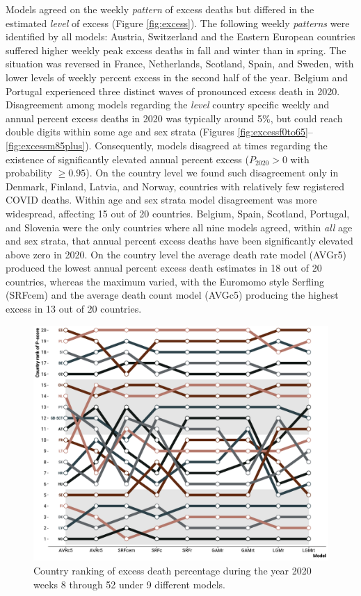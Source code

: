 \documentclass[12pt]{article}
\begin{document}
Models agreed on the weekly \emph{pattern} of excess deaths but differed in the estimated \emph{level} of excess (Figure \ref{fig:excess}). The following weekly \emph{patterns} were identified by all models: Austria, Switzerland and the Eastern European countries suffered higher weekly peak excess deaths in fall and winter than in spring. The situation was reversed in France, Netherlands, Scotland, Spain, and Sweden, with lower levels of weekly percent excess in the second half of the year. Belgium and Portugal experienced three distinct waves of pronounced excess death in 2020. Disagreement among models regarding the \emph{level} country specific weekly and annual percent excess deaths in 2020 was typically around 5\%, but could reach double digits within some age and sex strata (Figures \ref{fig:excessf0to65}--\ref{fig:excessm85plus}). Consequently, models disagreed at times regarding the existence of significantly elevated annual percent excess ($P_{2020}>0$ with probability $\geq 0.95$). On the country level we found such disagreement only in Denmark, Finland, Latvia, and Norway, countries with relatively few registered COVID deaths. Within age and sex strata model disagreement was more widespread, affecting 15 out of 20 countries. Belgium, Spain, Scotland, Portugal, and Slovenia were the only countries where all nine models agreed, within \emph{all} age and sex strata, that annual percent excess deaths have been significantly elevated above zero in 2020. On the country level the average death rate model (AVGr5) produced the lowest annual percent excess death estimates in 18 out of 20 countries, whereas the maximum varied, with the Euromomo style Serfling (SRFcem) and the average death count model (AVGc5) producing the highest excess in 13 out of 20 countries.


\begin{figure}
  \caption{Country ranking of excess death percentage during the year 2020 weeks 8 through 52 under 9 different models.}
  \label{fig:rank}
  \includegraphics{rank.pdf}
\end{figure}
\end{document}
